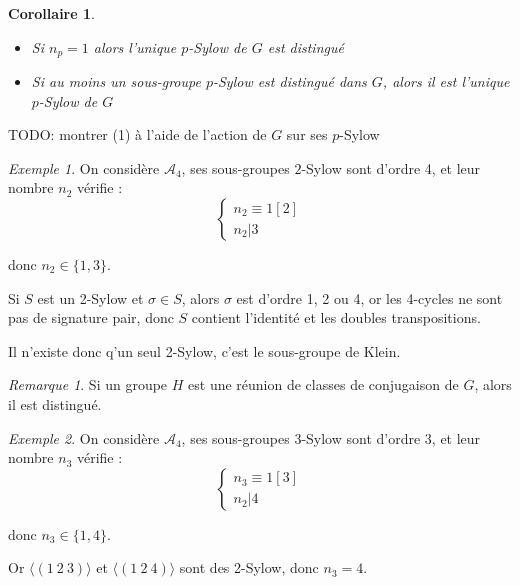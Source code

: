 \documentclass[]{article}
\newtheorem{mycor}{Corollaire}
\theoremstyle{remark}
\newtheorem{myrem}{Remarque}
\newtheorem{myexmpl}{Exemple}
\theoremstyle{definition}
\begin{document}
\begin{mycor}
	\leavevmode
	\begin{itemize}
		\item Si $n_p = 1$ alors l'unique $p$-Sylow de $G$ est distingué
		\item Si au moins un sous-groupe $p$-Sylow est distingué dans $G$, alors il est l'unique $p$-Sylow de $G$
	\end{itemize}
\end{mycor}

TODO: montrer (1) à l'aide de l'action de $G$ sur ses $p$-Sylow

\begin{myexmpl}
	On considère $\mathcal{A}_4$, ses sous-groupes $2$-Sylow sont d'ordre 4, et leur nombre $n_2$ vérifie :
	$$\left\{\begin{array}{l}
		n_2 \equiv 1 [2] \\
		n_2 | 3
	\end{array}
	\right.$$
	
	donc $n_2 \in \{1, 3\}$.
	
	Si $S$ est un 2-Sylow et $\sigma \in S$, alors $\sigma$ est d'ordre 1, 2 ou 4, or les 4-cycles ne sont pas de signature pair, donc $S$ contient l'identité et les doubles transpositions.

	Il n'existe donc q'un seul 2-Sylow, c'est le sous-groupe de Klein.
\end{myexmpl}

\begin{myrem}
	Si un groupe $H$ est une réunion de classes de conjugaison de $G$, alors il est distingué.
\end{myrem}

\begin{myexmpl}
	On considère $\mathcal{A}_4$, ses sous-groupes $3$-Sylow sont d'ordre 3, et leur nombre $n_3$ vérifie :
		$$\left\{\begin{array}{l}
			n_3 \equiv 1 [3] \\
			n_2 | 4
		\end{array}
		\right.$$
		
	donc $n_3 \in \{1, 4\}$.
	
	Or $\langle(1 ~ 2 ~ 3)\rangle$ et $\langle(1 ~ 2 ~ 4)\rangle$ sont des 2-Sylow, donc $n_3 = 4$.
\end{myexmpl}
\end{document}
